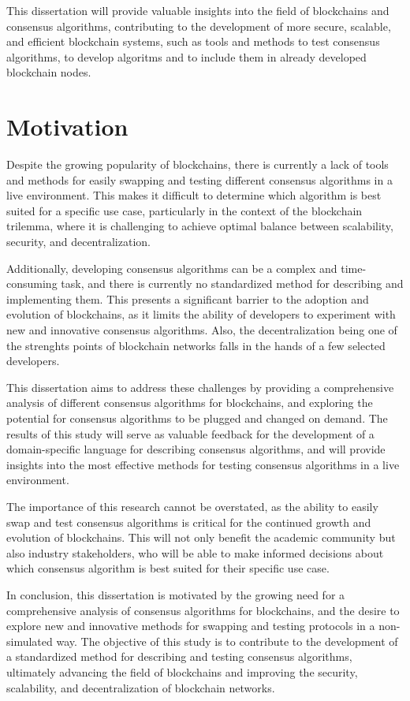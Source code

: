 This dissertation will provide valuable insights into the field of blockchains and consensus algorithms, contributing to the development of more secure, scalable, and efficient blockchain systems, such as tools and methods to test consensus algorithms, to develop algoritms and to include them in already developed blockchain nodes.

\section{Motivation}

Despite the growing popularity of blockchains, there is currently a lack of tools and methods for easily swapping and testing different consensus algorithms in a live environment.
This makes it difficult to determine which algorithm is best suited for a specific use case, particularly in the context of the blockchain trilemma, where it is challenging to achieve optimal balance between scalability, security, and decentralization.

Additionally, developing consensus algorithms can be a complex and time-consuming task, and there is currently no standardized method for describing and implementing them.
This presents a significant barrier to the adoption and evolution of blockchains, as it limits the ability of developers to experiment with new and innovative consensus algorithms. 
Also, the decentralization being one of the strenghts points of blockchain networks falls in the hands of a few selected developers.

This dissertation aims to address these challenges by providing a comprehensive analysis of different consensus algorithms for blockchains, and exploring the potential for consensus algorithms to be plugged and changed on demand.
The results of this study will serve as valuable feedback for the development of a domain-specific language for describing consensus algorithms, and will provide insights into the most effective methods for testing consensus algorithms in a live environment.

The importance of this research cannot be overstated, as the ability to easily swap and test consensus algorithms is critical for the continued growth and evolution of blockchains.
This will not only benefit the academic community but also industry stakeholders, who will be able to make informed decisions about which consensus algorithm is best suited for their specific use case.

In conclusion, this dissertation is motivated by the growing need for a comprehensive analysis of consensus algorithms for blockchains, and the desire to explore new and innovative methods for swapping and testing protocols in a non-simulated way.
The objective of this study is to contribute to the development of a standardized method for describing and testing consensus algorithms, ultimately advancing the field of blockchains and improving the security, scalability, and decentralization of blockchain networks.

